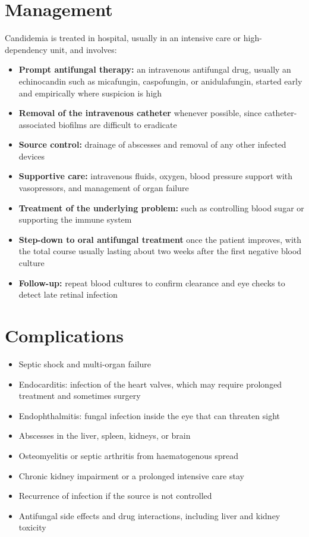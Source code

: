 \section*{Management}
Candidemia is treated in hospital, usually in an intensive care or high-dependency unit, and involves:
\begin{itemize}
    \item \textbf{Prompt antifungal therapy:} an intravenous antifungal drug, usually an echinocandin such as micafungin, caspofungin, or anidulafungin, started early and empirically where suspicion is high
    \item \textbf{Removal of the intravenous catheter} whenever possible, since catheter-associated biofilms are difficult to eradicate
    \item \textbf{Source control:} drainage of abscesses and removal of any other infected devices
    \item \textbf{Supportive care:} intravenous fluids, oxygen, blood pressure support with vasopressors, and management of organ failure
    \item \textbf{Treatment of the underlying problem:} such as controlling blood sugar or supporting the immune system
    \item \textbf{Step-down to oral antifungal treatment} once the patient improves, with the total course usually lasting about two weeks after the first negative blood culture
    \item \textbf{Follow-up:} repeat blood cultures to confirm clearance and eye checks to detect late retinal infection
\end{itemize}

\section*{Complications}
\begin{itemize}
    \item Septic shock and multi-organ failure
    \item Endocarditis: infection of the heart valves, which may require prolonged treatment and sometimes surgery
    \item Endophthalmitis: fungal infection inside the eye that can threaten sight
    \item Abscesses in the liver, spleen, kidneys, or brain
    \item Osteomyelitis or septic arthritis from haematogenous spread
    \item Chronic kidney impairment or a prolonged intensive care stay
    \item Recurrence of infection if the source is not controlled
    \item Antifungal side effects and drug interactions, including liver and kidney toxicity
\end{itemize}

